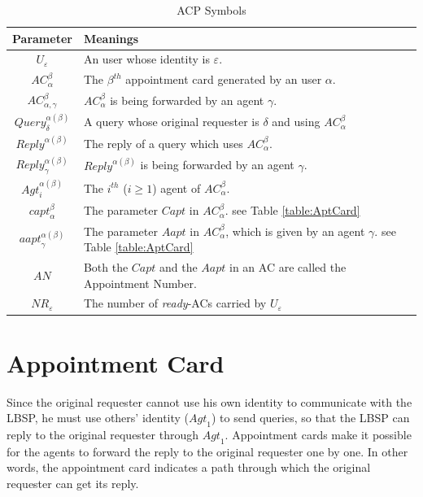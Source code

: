 \begin{table} [hbtp]
\caption{ACP Symbols}
\label{table:ACPSymbols}
\centering
\tabulinesep=2mm
\begin{tabu}{|c|l|} \hline 
Parameter & Meanings \\ \hline 
${U}_{\varepsilon}$ & An user whose identity is $\varepsilon$. \\ \hline 
${AC}_{\alpha}^{\beta}$ & The $\beta^{th}$ appointment card generated by an user $\alpha$. \\ \hline 
${AC}_{{\alpha},{\gamma}}^{\beta}$ & ${AC}_{\alpha}^{\beta}$ is being forwarded by an agent $\gamma$. \\ \hline 
${Query}_{\delta}^{{\alpha}\left({\beta}\right)}$ & A query whose original requester is $\delta$ and using ${AC}_{\alpha}^{\beta}$ \\ \hline 
${{Reply}}^{{\alpha}\left({\beta}\right)}$ & The reply of a query which uses ${AC}_{\alpha}^{\beta}$. \\ \hline 
${{Reply}}_{\gamma}^{{\alpha}\left({\beta}\right)}$ & ${Reply}^{\alpha\left(\beta\right)}$ is being forwarded by an agent $\gamma$. \\ \hline 
${{Agt}}_{i}^{{\alpha}\left({\beta}\right)}$ & The $i^{th}$ ($i\geq1$) agent of ${AC}_{\alpha}^{\beta}$. \\ \hline 
${{capt}}_{\alpha}^{\beta}$ & The parameter $Capt$ in ${AC}_\alpha^\beta$. see Table \ref{table:AptCard} \\ \hline 
${{aapt}}_{\gamma}^{{\alpha}\left({\beta}\right)}$ & The parameter $Aapt$ in ${AC}_{\alpha}^{\beta}$, which is given by an agent $\gamma$. see Table \ref{table:AptCard} \\ \hline 
$AN$ & Both the $Capt$ and the $Aapt$ in an AC are called the Appointment Number. \\ \hline 
${NR}_{\varepsilon}$ & The number of \textit{ready}-ACs carried by ${U}_{\varepsilon}$ \\ \hline 
\end{tabu}
\end{table}

\section{ Appointment Card}

\noindent Since the original requester cannot use his own identity to communicate with the LBSP, he must use others' identity (${Agt}_1$) to send queries, so that the LBSP can reply to the original requester through ${Agt}_1$. Appointment cards make it possible for the agents to forward the reply to the original requester one by one. In other words, the appointment card indicates a path through which the original requester can get its reply. 

